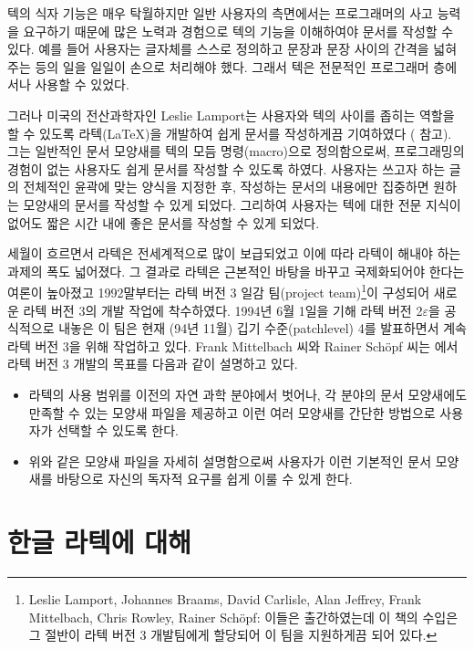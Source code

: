 텍의 식자 기능은 매우 탁월하지만 일반 사용자의 측면에서는
프로그래머의 사고 능력을 요구하기 때문에 많은 노력과 경험으로 텍의
기능을 이해하여야 문서를 작성할 수 있다.  예를 들어 사용자는
글자체를 스스로 정의하고 문장과 문장 사이의 간격을 넓혀주는 등의 일을
일일이 손으로 처리해야 했다. 그래서 텍은 전문적인 프로그래머
층에서나 사용할 수 있었다.

그러나 미국의 전산과학자인 Les\-lie Lam\-port는 사용자와 텍의 사이를
좁히는 역할을 할 수 있도록 라텍(\LaTeX)을 개발하여
쉽게 문서를 작성하게끔 기여하였다 (\cite{Lamport:1985:LDP}\를
참고).  그는 일반적인 문서 모양새를 텍의 모듬 명령(macro)으로
정의함으로써, 프로그래밍의 경험이 없는 사용자도 쉽게 문서를 작성할 수
있도록 하였다.  사용자는 쓰고자 하는 글의 전체적인 윤곽에 맞는
양식을 지정한 후, 작성하는 문서의 내용에만 집중하면 원하는 모양새의
문서를 작성할 수 있게 되었다.  그리하여 사용자는 텍에 대한 전문
지식이 없어도 짧은 시간 내에 좋은 문서를 작성할 수 있게
되었다.

세월이 흐르면서 라텍은 전세계적으로 많이 보급되었고 이에 따라 라텍이
해내야 하는 과제의 폭도 넓어졌다.  그 결과로 라텍은 근본적인 바탕을
바꾸고 국제화되어야 한다는 여론이 높아졌고 1992말부터는 라텍 버전 3
일감 팀(project team)\footnote{Leslie Lamport, Johannes Braams, David
  Carlisle, Alan Jeffrey, Frank Mittelbach, Chris Rowley, Rainer
  Sch\"opf: 이들은 \cite{Mittelbach:2004:LC}\을 출간하였는데 이 책의 수입은
  그 절반이 라텍 버전 3 개발팀에게 할당되어 이 팀을 지원하게끔 되어
  있다.}이 구성되어 새로운 라텍 버전 3의 개발 작업에
착수하였다. 1994년 6월 1일을 기해 라텍 버전
2$\varepsilon$을 공식적으로 내놓은 이 팀은 현재 (94년
11월) 깁기 수준(patchlevel) 4를 발표하면서 계속 라텍 버전 3을 위해
작업하고 있다.  Frank Mittelbach 씨와 Rainer Sch\"opf 씨는
\cite{Scherber:OST94}에서 라텍 버전 3 개발의
목표를 다음과 같이 설명하고 있다.
\begin{itemize}
\item 라텍의 사용 범위를 이전의 자연 과학 분야에서 벗어나, 각
  분야의 문서 모양새에도 만족할 수 있는 모양새 파일을 제공하고 이런
  여러 모양새를 간단한 방법으로 사용자가 선택할 수 있도록 한다.
\item 위와 같은 모양새 파일을 자세히 설명함으로써 사용자가 이런
  기본적인 문서 모양새를 바탕으로 자신의 독자적 요구를 쉽게 이룰 수
  있게 한다.
\end{itemize}


\section{한글 라텍에 대해}

